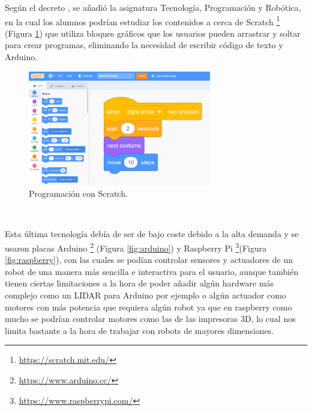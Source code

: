 Según el decreto \cite{Madrid}, se añadió la asignatura Tecnología, Programación y Robótica, en la cual los alumnos podrían estudiar los contenidos a cerca de Scratch \footnote{\url{https://scratch.mit.edu/}} (Figura \ref{fig:scratch}) que utiliza bloques gráficos que los usuarios pueden arrastrar y soltar para crear programas, eliminando la necesidad de escribir código de texto y Arduino. 

\begin{figure} [h!]
  \begin{center}
    \includegraphics[width=8cm]{figs/scratch.png}
  \end{center}
  \caption{Programación con Scratch.}
  \label{fig:scratch}
\end{figure}\

Esta última tecnología debía de ser de bajo coste debido a la alta demanda y se usaron placas Arduino \footnote{\url{https://www.arduino.cc/}} (Figura \ref{fig:arduino}) y Raspberry Pi \footnote{\url{https://www.raspberrypi.com/}}(Figura \ref{fig:raspberry}), con las cuales se podían controlar sensores y actuadores de un robot de una manera más sencilla e interactiva para el usuario, aunque también tienen ciertas limitaciones a la hora de poder añadir algún hardware más complejo como un LIDAR para Arduino por ejemplo o algún actuador como motores con más potencia que requiera algún robot ya que en raspberry como mucho se podrían controlar motores como las de las impresoras 3D, lo cual nos limita bastante a la hora de trabajar con robots de mayores dimensiones.


